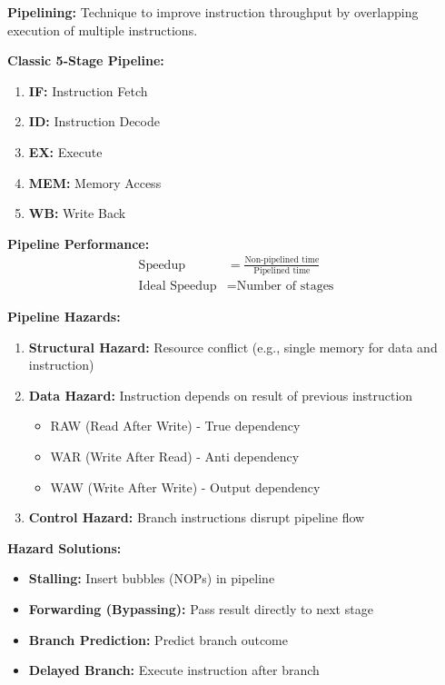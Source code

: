 \documentclass[11pt,a4paper]{article}
\begin{document}
\begin{defbox}
\textbf{Pipelining:} Technique to improve instruction throughput by overlapping execution of multiple instructions.
\end{defbox}

\textbf{Classic 5-Stage Pipeline:}
\begin{enumerate}
    \item \textbf{IF:} Instruction Fetch
    \item \textbf{ID:} Instruction Decode
    \item \textbf{EX:} Execute
    \item \textbf{MEM:} Memory Access
    \item \textbf{WB:} Write Back
\end{enumerate}

\begin{formulabox}
\textbf{Pipeline Performance:}
\begin{align*}
    \text{Speedup} &= \frac{\text{Non-pipelined time}}{\text{Pipelined time}} \\
    \text{Ideal Speedup} &= \text{Number of stages}
\end{align*}
\end{formulabox}

\textbf{Pipeline Hazards:}
\begin{enumerate}
    \item \textbf{Structural Hazard:} Resource conflict (e.g., single memory for data and instruction)
    \item \textbf{Data Hazard:} Instruction depends on result of previous instruction
    \begin{itemize}
        \item RAW (Read After Write) - True dependency
        \item WAR (Write After Read) - Anti dependency
        \item WAW (Write After Write) - Output dependency
    \end{itemize}
    \item \textbf{Control Hazard:} Branch instructions disrupt pipeline flow
\end{enumerate}

\textbf{Hazard Solutions:}
\begin{itemize}
    \item \textbf{Stalling:} Insert bubbles (NOPs) in pipeline
    \item \textbf{Forwarding (Bypassing):} Pass result directly to next stage
    \item \textbf{Branch Prediction:} Predict branch outcome
    \item \textbf{Delayed Branch:} Execute instruction after branch
\end{itemize}
\end{document}
